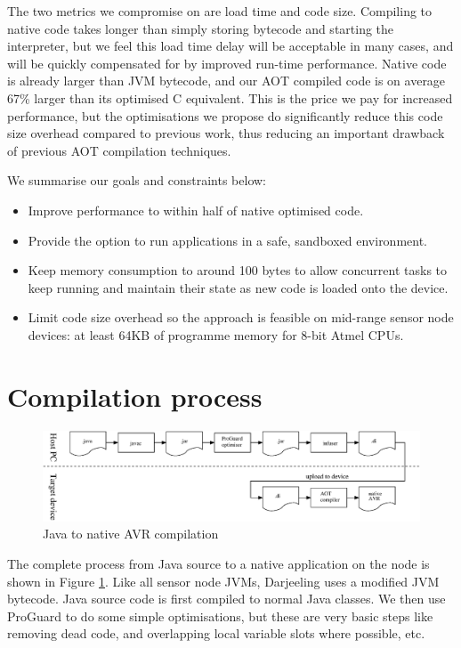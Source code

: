 The two metrics we compromise on are load time and code size. Compiling to native code takes longer than simply storing bytecode and starting the interpreter, but we feel this load time delay will be acceptable in many cases, and will be quickly compensated for by improved run-time performance. Native code is already larger than JVM bytecode, and our AOT compiled code is on average 67\% larger than its optimised C equivalent. This is the price we pay for increased performance, but the optimisations we propose do significantly reduce this code size overhead compared to previous work, thus reducing an important drawback of previous AOT compilation techniques.

We summarise our goals and constraints below:
\begin{itemize}
  \item Improve performance to within half of native optimised code.
  \item Provide the option to run applications in a safe, sandboxed environment.
  \item Keep memory consumption to around 100 bytes to allow concurrent tasks to keep running and maintain their state as new code is loaded onto the device.
  \item Limit code size overhead so the approach is feasible on mid-range sensor node devices: at least 64KB of programme memory for 8-bit Atmel CPUs.
\end{itemize}

\section{Compilation process}
\label{sec-compilation-process}

\begin{figure}
\includegraphics[width=\linewidth]{compilation-process.eps}
\caption{Java to native AVR compilation}
\label{fig-translation-process}
\end{figure}

The complete process from Java source to a native application on the node is shown in Figure \ref{fig-translation-process}. Like all sensor node JVMs, Darjeeling uses a modified JVM bytecode. Java source code is first compiled to normal Java classes. We then use ProGuard \cite{proguard} to do some simple optimisations, but these are very basic steps like removing dead code, and overlapping local variable slots where possible, etc.

